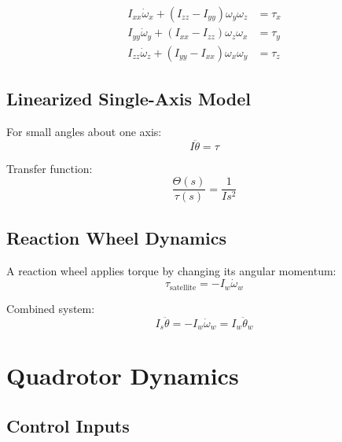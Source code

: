 \begin{align}
I_{xx}\dot{\omega}_x + (I_{zz} - I_{yy})\omega_y\omega_z &= \tau_x \\
I_{yy}\dot{\omega}_y + (I_{xx} - I_{zz})\omega_z\omega_x &= \tau_y \\
I_{zz}\dot{\omega}_z + (I_{yy} - I_{xx})\omega_x\omega_y &= \tau_z
\end{align}

\subsection{Linearized Single-Axis Model}

For small angles about one axis:
\begin{equation}
I\ddot{\theta} = \tau
\end{equation}

Transfer function:
\begin{equation}
\frac{\Theta(s)}{\tau(s)} = \frac{1}{Is^2}
\end{equation}

\subsection{Reaction Wheel Dynamics}

A reaction wheel applies torque by changing its angular momentum:
\begin{equation}
\tau_{\text{satellite}} = -I_w\dot{\omega}_w
\end{equation}

Combined system:
\begin{equation}
I_s\ddot{\theta} = -I_w\dot{\omega}_w = I_w\ddot{\theta}_w
\end{equation}

\section{Quadrotor Dynamics}
\label{sec:quadrotor}





\subsection{Control Inputs}

